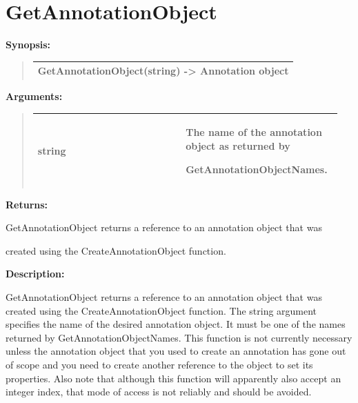 \documentclass[letterpaper,10pt,english]{sphinxmanual}
\begin{document}
\section{GetAnnotationObject}
\label{functions:getannotationobject}
\begin{DUlineblock}{0em}
\item[] \textbf{Synopsis:}
\end{DUlineblock}
\begin{quote}

\begin{tabulary}{\linewidth}{|L|}
\hline

GetAnnotationObject(string) -\textgreater{} Annotation object
\\
\hline\end{tabulary}

\end{quote}

\begin{DUlineblock}{0em}
\item[] 
\item[] \textbf{Arguments:}
\end{DUlineblock}
\begin{quote}

\begin{tabular}{|p{0.475\linewidth}|p{0.475\linewidth}|}
\hline

string
 & 
\begin{DUlineblock}{0em}
\item[] The name of the annotation object as returned by
\item[] GetAnnotationObjectNames.
\end{DUlineblock}
\\
\hline\end{tabular}

\end{quote}

\begin{DUlineblock}{0em}
\item[] 
\item[] \textbf{Returns:}
\item[] GetAnnotationObject returns a reference to an annotation object that was
\item[] created using the CreateAnnotationObject function.
\item[] 
\item[] \textbf{Description:}
\item[] GetAnnotationObject returns a reference to an annotation object that was
created using the CreateAnnotationObject function. The string
argument specifies the name of the desired annotation object. It must be
one of the names returned by GetAnnotationObjectNames. This function is not
currently necessary unless the annotation object that you used to create an
annotation has gone out of scope and you need to create another reference
to the object to set its properties. Also note that although this function
will apparently also accept an integer index, that mode of access is not
reliably and should be avoided.
\end{DUlineblock}
\end{document}

